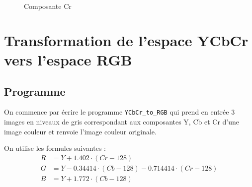 \documentclass[french,a4paper,10pt]{article}
\begin{document}
\begin{figure}[!htb]
\begin{minipage}{0.3\textwidth}
            \caption{Composante Cr}\label{Fig:peppers_cr}
        \end{minipage}
    \end{figure}

    \newpage

    \section{Transformation de l'espace YCbCr vers l'espace RGB}\label{sec:3}

    \subsection{Programme}\label{subsec:3.1}

    On commence par écrire le programme \texttt{YCbCr\_to\_RGB} qui prend en
    entrée 3 images en niveaux de gris correspondant aux composantes Y, Cb et Cr
    d'une image couleur et renvoie l'image couleur originale.

    On utilise les formules suivantes :
    \[\begin{aligned}
            R &= Y + 1.402 \cdot (Cr - 128) \\
            G &= Y - 0.34414 \cdot (Cb - 128) - 0.714414 \cdot (Cr - 128) \\
            B &= Y + 1.772 \cdot (Cb - 128)
    \end{aligned}\]
\end{document}
